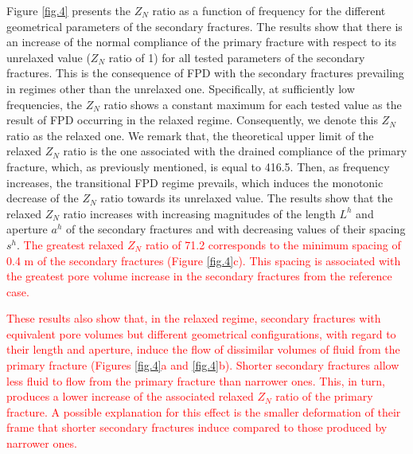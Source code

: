 \documentclass[draft]{agujournal2019}
\newcommand{\red}{\textcolor{red}}
\begin{document}
Figure \ref{fig.4} presents the $Z_N$ ratio as a function of frequency for the different geometrical parameters of the secondary fractures. The results show that there is an increase of the normal compliance of the primary fracture with respect to its unrelaxed value ($Z_N$ ratio of 1) for all tested parameters of the secondary fractures. This is the consequence of FPD with the secondary fractures prevailing in regimes other than the unrelaxed one. Specifically, at sufficiently low frequencies, the
$Z_N$ ratio shows a constant maximum for each tested value as the result of FPD occurring in the relaxed regime. Consequently, we denote this $Z_N$ ratio as the relaxed one. We remark that, the theoretical upper limit of the relaxed $Z_N$ ratio is the one associated with the drained compliance of the primary fracture, which, as previously mentioned, is equal to 416.5. 
Then, as frequency increases, the transitional FPD regime prevails, which induces the monotonic decrease of the $Z_N$ ratio towards its unrelaxed value. The results show that the relaxed $Z_N$ ratio increases with increasing magnitudes of the length $L^h$ and aperture $a^h$ of the secondary fractures and with decreasing  values of their spacing $s^h$. 
\red{
The greatest relaxed $Z_N$ ratio of 71.2 corresponds to the minimum spacing of 0.4 m of the secondary fractures (Figure \ref{fig.4}c). This spacing is associated with the greatest pore volume increase in the secondary fractures from the reference case.
}

\red{These results also show that, in the relaxed regime, secondary fractures with equivalent pore volumes but different geometrical configurations, with regard to their length and aperture, induce the flow of dissimilar volumes of fluid  from the primary fracture (Figures \ref{fig.4}a and \ref{fig.4}b). Shorter secondary fractures allow less fluid to flow from the primary fracture than narrower ones. This, in turn, produces a lower increase of the associated relaxed $Z_N$ ratio of the primary fracture. A possible explanation for this effect is the smaller deformation of their frame that shorter secondary fractures induce compared to those produced by narrower ones. }
\end{document}
